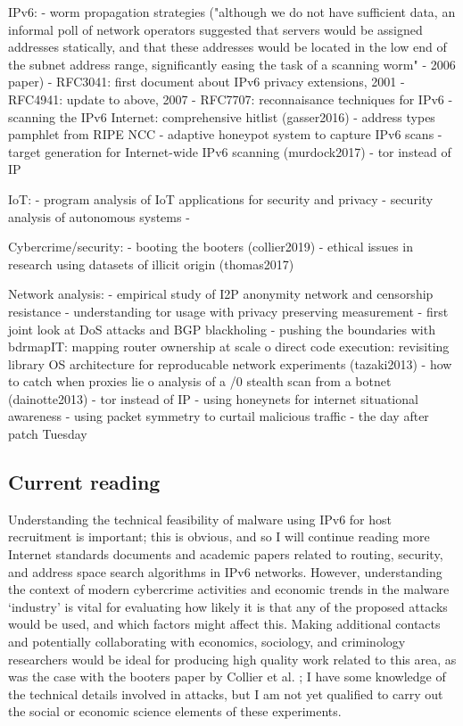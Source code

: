 \documentclass[10pt,sigconf]{acmart}
\begin{document}
IPv6:
	- worm propagation strategies ("although we do not have sufficient data, an informal poll of network operators suggested that servers would be assigned addresses statically, and that these addresses would be located in the low end of the subnet address range, significantly easing the task of a scanning worm" - 2006 paper)
	- RFC3041: first document about IPv6 privacy extensions, 2001
	- RFC4941: update to above, 2007
	- RFC7707: reconnaisance techniques for IPv6
	- scanning the IPv6 Internet: comprehensive hitlist (gasser2016)
	- address types pamphlet from RIPE NCC
	- adaptive honeypot system to capture IPv6 scans
	- target generation for Internet-wide IPv6 scanning (murdock2017)
	- tor instead of IP

IoT:
	- program analysis of IoT applications for security and privacy
	- security analysis of autonomous systems
	- 

Cybercrime/security:
	- booting the booters (collier2019)
	- ethical issues in research using datasets of illicit origin (thomas2017)

Network analysis:
	- empirical study of I2P anonymity network and censorship resistance
	- understanding tor usage with privacy preserving measurement
	- first joint look at DoS attacks and BGP blackholing
	- pushing the boundaries with bdrmapIT: mapping router ownership at scale
	o direct code execution: revisiting library OS architecture for reproducable network experiments (tazaki2013)
	- how to catch when proxies lie
	o analysis of a /0 stealth scan from a botnet (dainotte2013)
	- tor instead of IP
	- using honeynets for internet situational awareness
	- using packet symmetry to curtail malicious traffic
	- the day after patch Tuesday

\subsection{Current reading}

Understanding the technical feasibility of malware using IPv6 for host recruitment is important;
this is obvious, and so I will continue reading more Internet standards documents and academic papers related to routing, security, and address space search algorithms in IPv6 networks.
However, understanding the context of modern cybercrime activities and economic trends in the malware `industry' is vital for evaluating how likely it is that any of the proposed attacks would be used, and which factors might affect this.
Making additional contacts and potentially collaborating with economics, sociology, and criminology researchers would be ideal for producing high quality work related to this area, as was the case with the booters paper by Collier et al. \cite{collier2019};
I have some knowledge of the technical details involved in attacks, but I am not yet qualified to carry out the social or economic science elements of these experiments.
\end{document}
